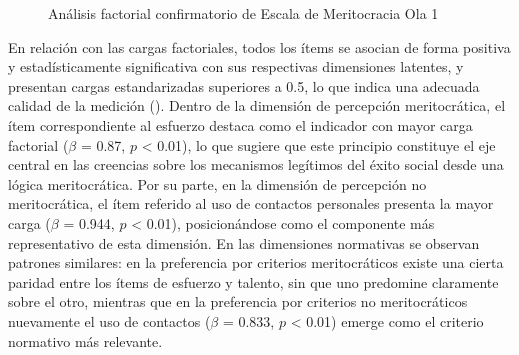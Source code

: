 \documentclass[
  12pt,
]{article}
\begin{document}
\begin{figure}

\caption{\label{fig-cfa1}Análisis factorial confirmatorio de Escala de
Meritocracia Ola 1}


\end{figure}%

En relación con las cargas factoriales, todos los ítems se asocian de
forma positiva y estadísticamente significativa con sus respectivas
dimensiones latentes, y presentan cargas estandarizadas superiores a
0.5, lo que indica una adecuada calidad de la medición
(). Dentro de la
dimensión de percepción meritocrática, el ítem correspondiente al
esfuerzo destaca como el indicador con mayor carga factorial (\(\beta\)
= 0.87, \(p\) \textless{} 0.01), lo que sugiere que este principio
constituye el eje central en las creencias sobre los mecanismos
legítimos del éxito social desde una lógica meritocrática. Por su parte,
en la dimensión de percepción no meritocrática, el ítem referido al uso
de contactos personales presenta la mayor carga (\(\beta\) = 0.944,
\(p\) \textless{} 0.01), posicionándose como el componente más
representativo de esta dimensión. En las dimensiones normativas se
observan patrones similares: en la preferencia por criterios
meritocráticos existe una cierta paridad entre los ítems de esfuerzo y
talento, sin que uno predomine claramente sobre el otro, mientras que en
la preferencia por criterios no meritocráticos nuevamente el uso de
contactos (\(\beta\) = 0.833, \(p\) \textless{} 0.01) emerge como el
criterio normativo más relevante.
\end{document}
